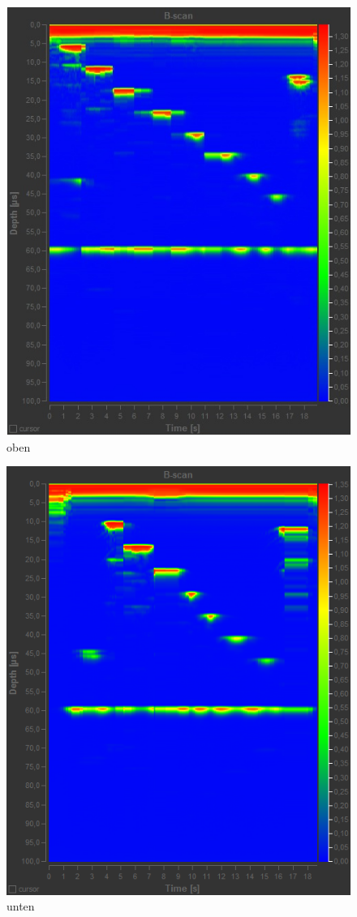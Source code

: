\begin{figure}
	\centering
	\includegraphics[width=\textwidth]{oben.png}
	\caption{oben}
	\label{oben}
\end{figure}
\begin{figure}
	\centering
	\includegraphics[width=\textwidth]{unten.png}
	\caption{unten}
	\label{unten}
\end{figure}